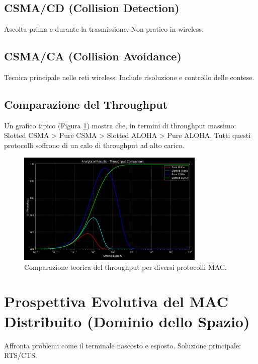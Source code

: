 \subsection{CSMA/CD (Collision Detection)}
Ascolta prima e durante la trasmissione. Non pratico in wireless.

\subsection{CSMA/CA (Collision Avoidance)}
Tecnica principale nelle reti wireless. Include risoluzione e controllo delle contese.

\subsection{Comparazione del Throughput}
Un grafico tipico (Figura \ref{fig:throughput_comparison}) mostra che, in termini di throughput massimo:
Slotted CSMA > Pure CSMA > Slotted ALOHA > Pure ALOHA.
Tutti questi protocolli soffrono di un calo di throughput ad alto carico.

\begin{figure}[H]
\centering
\includegraphics[width=0.8\textwidth]{images/throughput_comparison.png}
\caption{Comparazione teorica del throughput per diversi protocolli MAC.}
\label{fig:throughput_comparison}
\end{figure}


\section{Prospettiva Evolutiva del MAC Distribuito (Dominio dello Spazio)}
Affronta problemi come il terminale nascosto e esposto. Soluzione principale: RTS/CTS.

